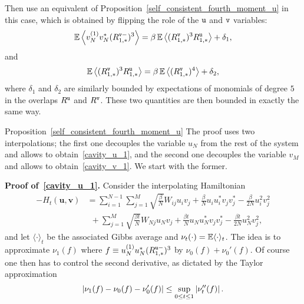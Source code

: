 \documentclass[final,12pt]{colt2018} %
\newcommand{\utt}{\textup{\texttt{u}}}
\newcommand{\vtt}{\textup{\texttt{v}}}
\renewcommand{\u}{\bm{u}}
\renewcommand{\v}{\bm{v}}
\begin{document}
Then use an equivalent of Proposition~\ref{self_consistent_fourth_moment_u} in this case, which is obtained by flipping the role of the $\utt$ and $\vtt$ variables: 
\[\E\left \langle v^{(1)}_{N}v^{*}_{N}(R^{\vtt-}_{1,*})^3\right \rangle = \beta\E\left \langle(R^{\vtt}_{1,*})^3R^{\utt}_{1,*}\right \rangle + \delta_1,\] 
and
\[\E\left \langle (R^{\vtt}_{1,*})^3R^{\utt}_{1,*}\right \rangle = \beta\E\left \langle(R^{\vtt}_{1,*})^4\right \rangle + \delta_2,\]
where $\delta_1$ and $\delta_2$ are similarly bounded by expectations of monomials of degree $5$ in the overlaps $R^\utt$ and $R^\vtt$. These two quantities are then bounded in exactly the same way.   

\vspace{.5cm}
\noindent\begin{proofof}{Proposition~\ref{self_consistent_fourth_moment_u}}
The proof uses two interpolations; the first one decouples the variable $u_N$ from the rest of the system and allows to obtain~\eqref{cavity_u_1}, and the second one decouples the variable $v_M$ and allows to obtain~\eqref{cavity_v_1}. We start with the former. 

\vspace{.3cm}
\noindent\textbf{Proof of~\eqref{cavity_u_1}.} Consider the interpolating Hamiltonian 
\begin{align*}
-H_t(\u,\v) &=  \sum_{i=1}^{N-1} \sum_{j=1}^{M} \sqrt{\frac{\beta}{N}}W_{ij}u_i v_j + \frac{\beta}{N}u_iu_i^*v_jv_j^*- \frac{\beta}{2N}u_i^2v_j^2 \\
&~~+  \sum_{j=1}^M \sqrt{\frac{\beta t}{N}}W_{Nj}u_N v_j + \frac{\beta t}{N}u_Nu_N^*v_jv_j^* - \frac{\beta t}{2N}u_N^2v_j^2,
\end{align*}
and let $\langle \cdot \rangle_t$ be the associated Gibbs average and $\nu_t(\cdot) = \operatorname{\mathbb{E}}\langle \cdot \rangle_t$. The idea is to approximate $\nu_1(f)$ where $f \equiv u^{(1)}_{N}u^{*}_{N}(R^{\utt-}_{1,*})^3$ by $\nu_0(f) + \nu_0'(f)$. Of course one then has to control the second derivative, as dictated by the Taylor approximation
\begin{equation}\label{taylor_expansion_second_order}
\left|\nu_1(f) - \nu_0(f) - \nu_0'(f)\right| \le \sup_{0 \le t\le 1} \left|\nu_t''(f)\right|.
\end{equation}


\end{proofof}
\end{document}
